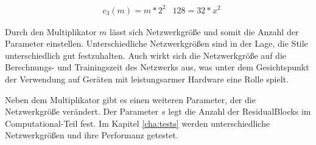 \begin{align}
	& c_{3}(m) = m * 2^{2}
	& 128 = 32 * x^{2}
\end{align}

Durch den Multiplikator $ m $ lässt sich Netzwerkgröße und somit die Anzahl der Parameter einstellen. Unterschiedliche Netzwerkgrößen sind in der Lage, die Stile unterschiedlich gut festzuhalten. Auch wirkt sich die Netzwerkgröße auf die Berechnungs- und Trainingszeit des Netzwerks aus, was unter dem Gesichtspunkt der Verwendung auf Geräten mit leistungsarmer Hardware eine Rolle spielt.

Neben dem Multiplikator gibt es einen weiteren Parameter, der die Netzwerkgröße verändert. Der Parameter $ s $ legt die Anzahl der ResidualBlocks im Computational-Teil fest. Im Kapitel \ref{cha:tests} werden unterschiedliche Netzwerkgrößen und ihre Performanz getestet.